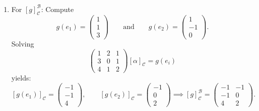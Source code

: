 \begin{exercisesolution}
\begin{enumerate}[label=\textbf{(\alph*)}]
\begin{enumerate}[label=\textbf{(\roman*)}]
        \item For $[g]_{\mathcal{C}}^{\mathcal{B}}$: Compute
        \[
        g(e_1) = \begin{pmatrix} 1 \\ 1 \\ 3 \end{pmatrix} \qquad \text{and} \qquad g(e_2) = \begin{pmatrix} 1 \\ -1 \\ 0 \end{pmatrix}.
        \]
        Solving
        \[
        \begin{pmatrix} 1 & 2 & 1 \\ 3 & 0 & 1 \\ 4 & 1 & 2 \end{pmatrix} [\alpha]_{\mathcal{C}} = g(e_i)
        \]
        yields:
        \[
        [g(e_1)]_{\mathcal{C}} = \begin{pmatrix} -1 \\ -1 \\ 4 \end{pmatrix}, \qquad [g(e_2)]_{\mathcal{C}} = \begin{pmatrix} -1 \\ 0 \\ 2 \end{pmatrix}
        \implies [g]_{\mathcal{C}}^{\mathcal{B}} = \begin{pmatrix} -1 & -1 \\ -1 & 0 \\ 4 & 2 \end{pmatrix}.
        \]


\end{enumerate}
\end{enumerate}
\end{exercisesolution}
